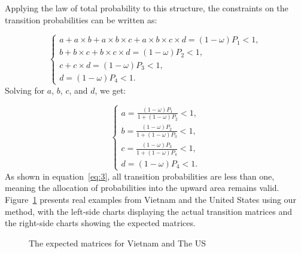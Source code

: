 

Applying the law of total probability to this structure, the constraints on the transition probabilities can be written as:

\[
\begin{cases}
a + a \times b + a \times b \times c + a \times b \times c \times d = (1 - \omega) P_1 < 1, \\
b + b \times c + b \times c \times d = (1 - \omega) P_2 < 1, \\
c + c \times d = (1 - \omega) P_3 < 1, \\
d = (1 - \omega) P_4 < 1.
\end{cases}
\]
Solving for \( a \), \( b \), \( c \), and \( d \), we get:

\begin{equation}
\begin{cases}
\displaystyle a = \frac{(1 - \omega) P_1}{1 + (1 - \omega) P_2} < 1, \\
\displaystyle b = \frac{(1 - \omega) P_2}{1 + (1 - \omega) P_3} < 1, \\
\displaystyle c = \frac{(1 - \omega) P_3}{1 + (1 - \omega) P_4} < 1, \\
\displaystyle d = (1 - \omega) P_4 < 1.
\end{cases}
\label{eq:3}
\end{equation}
As shown in equation~\eqref{eq:3}, all transition probabilities are less than one, meaning the allocation of probabilities into the upward area remains valid. Figure~\ref{fig:VNM_USA} presents real examples from Vietnam and the United States using our method, with the left-side charts displaying the actual transition matrices and the right-side charts showing the expected matrices.

\begin{figure}[H]
    \centering
    \caption{The expected matrices for Vietnam and The US}
    \label{fig:VNM_USA}
\end{figure}



